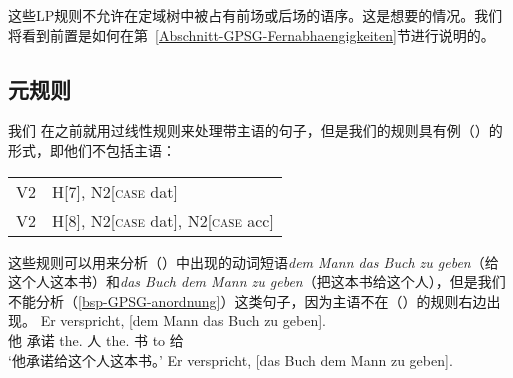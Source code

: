 这些LP规则不允许在定域树中被占有前场或后场的语序。这是想要的情况。我们将看到前置是如何在第~\ref{Abschnitt-GPSG-Fernabhaengigkeiten}节进行说明的。

\subsection{元规则}
\label{sec-metarules-gpsg}

我们 在之前就用过线性规则来处理带主语的句子，但是我们的规则具有例（）的形式，即他们不包括主语：
\ea
\label{gpsg-regel-dat-ditransitiv}
\begin{tabular}[t]{@{}l@{~$\to$~}l@{}}
V2  & H[7], N2[\textsc{case} dat]                \\
V2  & H[8], N2[\textsc{case} dat], N2[\textsc{case} acc]  \\
\end{tabular}
\z
这些规则可以用来分析（）中出现的动词短语\emph{dem Mann das Buch zu geben}（给这个人这本书）和\emph{das Buch dem Mann zu geben}（把这本书给这个人），但是我们不能分析（\ref{bsp-GPSG-anordnung}）这类句子，因为主语不在（）的规则右边出现。
\eal
\ex 
\gll Er verspricht, [dem Mann das Buch zu geben].\\
     他 承诺    \spacebr{}the.\dat{} 人 the.\acc{} 书 to 给\\
\glt `他承诺给这个人这本书。'
\ex 
\gll Er verspricht, [das Buch dem Mann zu geben].\\
